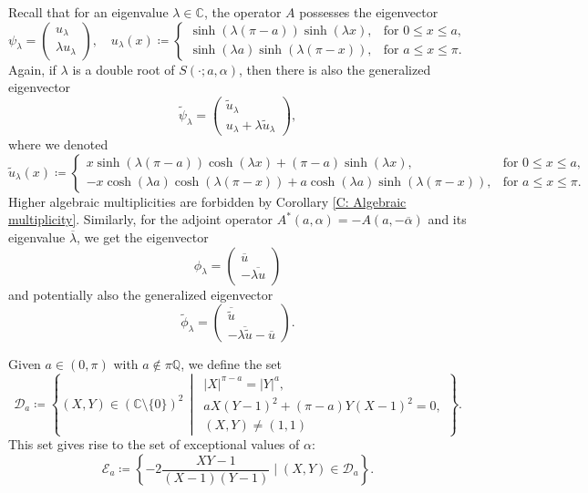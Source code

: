 \documentclass[11pt, a4paper,reqno]{amsart}
\theoremstyle{plain}
\theoremstyle{definition}
\theoremstyle{remark}
\renewcommand{\leq}{\leqslant}	\renewcommand{\geq}{\geqslant}
\newcommand{\1}{\mathds 1}
\begin{document}
Recall that for an eigenvalue $\lambda \in \mathbb C$, the operator $A$ possesses the eigenvector
\[
    \psi_\lambda = \begin{pmatrix}
        u_\lambda \\ \lambda u_\lambda
    \end{pmatrix}, \quad u_\lambda(x) \coloneqq \begin{cases}
        \sinh(\lambda(\pi-a))\sinh(\lambda x), & \text{for } 0 \leq x \leq a, \\
        \sinh(\lambda a)\sinh(\lambda(\pi-x)), & \text{for } a \leq x \leq \pi.
    \end{cases}
    \]
Again, if $\lambda$ is a double root of $S(\cdot; a, \alpha)$, then there is also the generalized eigenvector
    \[
    \tilde \psi_\lambda = \begin{pmatrix}
        \tilde u_\lambda \\
        u_\lambda + \lambda \tilde u_\lambda
    \end{pmatrix},
    \]
    where we denoted
    \[
    \tilde u_\lambda(x) \coloneqq \begin{cases}
        x\sinh(\lambda(\pi-a))\cosh(\lambda x) + (\pi-a)\sinh(\lambda x), &\text{for } 0 \leq x \leq a, \\
        -x\cosh(\lambda a)\cosh(\lambda(\pi-x)) + a\cosh(\lambda a)\sinh(\lambda(\pi-x)),& \text{for } a \leq x \leq \pi. 
    \end{cases}
    \]
 Higher algebraic multiplicities are forbidden by Corollary \ref{C: Algebraic multiplicity}.
 Similarly, for the adjoint operator $A^\ast(a,\alpha) = -A(a, -\overline{\alpha})$ and its eigenvalue $\overline{\lambda}$, we get the eigenvector
 \[
 \phi_\lambda = \begin{pmatrix}
     \overline{u} \\ - \overline{\lambda u}
 \end{pmatrix}
 \]
 and potentially also the generalized eigenvector
 \[
 \tilde \phi_\lambda =\begin{pmatrix}
        \overline{\tilde u} \\ -\overline{\lambda\tilde u} - \overline{u}
    \end{pmatrix}.
 \]




Given $a \in (0, \pi)$ with $a \notin \pi\mathbb Q$, we define the set
\begin{equation}
\mathcal D_a \coloneqq
\left\{
(X,Y) \in (\mathbb C \setminus \{0\})^2
\,\middle|\,
\begin{array}{l}
|X|^{\pi-a} = |Y|^a,\\
aX(Y-1)^2 + (\pi-a)Y(X-1)^2 = 0,\\
(X,Y) \neq (1,1)
\end{array}
\right\}.
\label{eq: D_a definition}
\end{equation}
This set gives rise to the set of exceptional values of $\alpha$:
\begin{equation}
    \mathcal E_a \coloneqq \left\{-2\frac{XY-1}{(X-1)(Y-1)} \mid (X, Y) \in \mathcal D_a\right\}.
    \label{eq: Exceptional alpha}
\end{equation}
\end{document}
